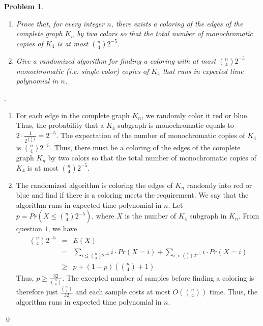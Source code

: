 \documentclass[12pt]{article}
\newtheorem{hw}{Problem}
\newenvironment{sol}
  {\par\vspace{3mm}\noindent{\it Solution}.}
  {\qed}
\begin{document}
\begin{hw}
\begin{enumerate}
  \item Prove that, for every integer $n$, there exists a coloring of the edges of the complete graph $K_n$ by two colors so that the total number of monochromatic copies of $K_4$ is at most ${n\choose 4}2^{-5}$.
  \item Give a randomized algorithm for finding a coloring with at most ${n \choose 4}2^{-5}$ monochromatic (i.e. single-color) copies of $K_4$ that runs in expected time polynomial in $n$.
\end{enumerate}
\end{hw}
\begin{sol}
	\begin{enumerate}
		\item For each edge in the complete graph $K_n$, we randomly color it red or blue. Thus, the probability that a $K_4$ subgraph is monochromatic equals to $2 \cdot \frac{1}{2^{{4 \choose 2}}} = 2^{-5}$. The expectation of the number of monochromatic copies of $K_4$ is ${n \choose 4}2^{-5}$. Thus, there must be a coloring of the edges of the complete graph $K_n$ by two colors so that the total number of monochromatic copies of $K_4$ is at most ${n\choose 4}2^{-5}$.
		
		\item The randomized algorithm is coloring the edges of $K_n$ randomly into red or blue and find if there is a coloring meets the requirement. We say that the algorithm runs in expected time polynomial in $n$. Let $p = Pr(X \leq {n \choose 4}2^{-5})$, where $X$ is the number of $K_4$ subgraph in $K_n$. From question $1$, we have
		\begin{displaymath}
			\begin{array}{lcl}
				{n \choose 4}2^{-5} & = & E(X) \\
									& = & \sum_{i \leq {n \choose 4}2^{-5}}i \cdot Pr(X = i) + \sum_{i > {n \choose 4}2^{-5}}i \cdot Pr(X = i) \\
									& \geq & p + (1-p)({n \choose 4} + 1)
			\end{array}
		\end{displaymath}
		Thus, $p \geq \frac{32}{{n \choose 4}}$. The excepted number of samples before finding a coloring is therefore just $\frac{{n \choose 4}}{32}$ and each sample costs at most $O({n \choose 4})$ time. Thus, the algorithm runs in expected time polynomial in $n$.
	\end{enumerate}
\end{sol}
\end{document}
